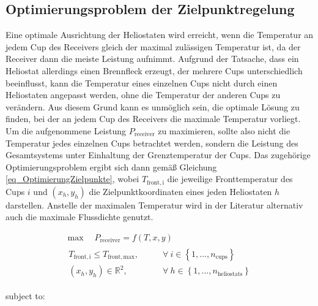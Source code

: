 \subsection{Optimierungsproblem der Zielpunktregelung} \label{subsec_OptimierungZielpunkte}
Eine optimale Ausrichtung der Heliostaten wird erreicht, wenn die Temperatur an jedem Cup des Receivers gleich der maximal zulässigen Temperatur ist, da der Receiver dann die meiste Leistung aufnimmt.
Aufgrund der Tatsache, dass ein Heliostat allerdings einen Brennfleck erzeugt, der mehrere Cups unterschiedlich beeinflusst, kann die Temperatur eines einzelnen Cups nicht durch einen Heliostaten angepasst werden, ohne die Temperatur der anderen Cups zu verändern.
Aus diesem Grund kann es unmöglich sein, die optimale Lösung zu finden, bei der an jedem Cup des Receivers die maximale Temperatur vorliegt.
Um die aufgenommene Leistung $P_{\mathrm{receiver}}$ zu maximieren, sollte also nicht die Temperatur jedes einzelnen Cups betrachtet werden, sondern die Leistung des Gesamtsystems unter Einhaltung der Grenztemperatur der Cups.
Das zugehörige Optimierungsproblem ergibt sich dann gemäß Gleichung \ref{eq_OptimierungZielpunkte}, wobei $T_{\mathrm{front,i}}$ die jeweilige Fronttemperatur des Cups $i$ und $(x_{h}, y_{h})$ die Zielpunktkoordinaten eines jeden Heliostaten $h$ darstellen.
Anstelle der maximalen Temperatur wird in der Literatur alternativ auch die maximale Flussdichte genutzt. \cite[S.15]{DissZanger}

\begin{equation} \label{eq_OptimierungZielpunkte}
    \begin{gathered}
\max \quad P_{\mathrm{receiver}}=f(T,x,y)  \qquad \\
        \begin{aligned}
T_{\mathrm{front,i}} \leq T_{\mathrm{front,max}}, \qquad                 & \forall~i \in \left\{1, ..., n_{\mathrm{cups}} \right\}       \\
\left(x_{h}, y_{h}\right) \in \mathbb{R}^2, \qquad & \forall~h \in \left\{1, ..., n_{\mathrm{heliostats}} \right\}
        \end{aligned}
    \end{gathered}
\end{equation}

\vspace*{-2.95\baselineskip}
\qquad subject to:
\vspace*{1.95\baselineskip}

